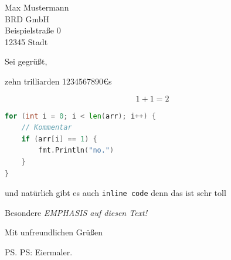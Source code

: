 \documentclass{scrlttr2} %
\begin{document}
\begin{letter}{
	Max Mustermann\\
	BRD GmbH\\
	Beispielstraße 0\\
	12345 Stadt
}


\opening{Sei gegrüßt,}

zehn trilliarden 1234567890€s

\[
	1 + 1 = 2
\]

\lstset{style=code}
\begin{lstlisting}[language=go,caption=Beispiel-Programm in Go]
for (int i = 0; i < len(arr); i++) {
	// Kommentar
	if (arr[i] == 1) {
		fmt.Println("no.")
	}
}
\end{lstlisting}


und natürlich gibt es auch \verb`inline code` denn das ist sehr toll

Besondere {\em EMPHASIS auf diesen Text!}


\closing{Mit unfreundlichen Grüßen}

\ps PS: Eiermaler.

\end{letter}
\end{document}
